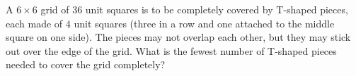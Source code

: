 A $6\times6$ grid of $36$ unit squares is to be completely covered by T-shaped pieces, each made of $4$ unit squares (three in a row and one attached to the middle square on one side). The pieces may not overlap each other, but they may stick out over the edge of the grid. What is the fewest number of T-shaped pieces needed to cover the grid completely?
